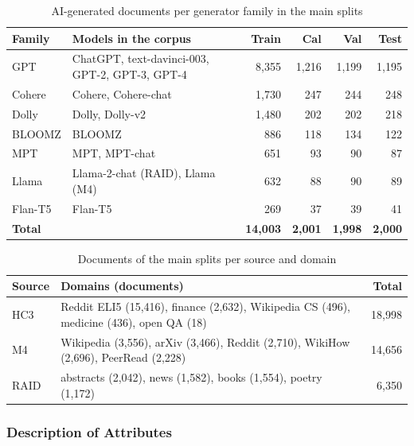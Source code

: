 \begin{table}[H]
\caption{AI-generated documents per generator family in the main splits}
\label{tab:families-corpus}
\centering
\small
\begin{tabularx}{\textwidth}{|p{2.4cm}|L|r|r|r|r|}
\hline
\textbf{Family} & \textbf{Models in the corpus} & \textbf{Train} & \textbf{Cal} & \textbf{Val} & \textbf{Test} \\ \hline
GPT & ChatGPT, text-davinci-003, GPT-2, GPT-3, GPT-4 & 8,355 & 1,216 & 1,199 & 1,195 \\ \hline
Cohere & Cohere, Cohere-chat & 1,730 & 247 & 244 & 248 \\ \hline
Dolly & Dolly, Dolly-v2 & 1,480 & 202 & 202 & 218 \\ \hline
BLOOMZ & BLOOMZ & 886 & 118 & 134 & 122 \\ \hline
MPT & MPT, MPT-chat & 651 & 93 & 90 & 87 \\ \hline
Llama & Llama-2-chat (RAID), Llama (M4) & 632 & 88 & 90 & 89 \\ \hline
Flan-T5 & Flan-T5 & 269 & 37 & 39 & 41 \\ \hline
\textbf{Total} & & \textbf{14,003} & \textbf{2,001} & \textbf{1,998} & \textbf{2,000} \\ \hline
\end{tabularx}
\end{table}

\begin{table}[H]
\caption{Documents of the main splits per source and domain}
\label{tab:domains-corpus}
\centering
\small
\begin{tabularx}{\textwidth}{|p{1.7cm}|L|r|}
\hline
\textbf{Source} & \textbf{Domains (documents)} & \textbf{Total} \\ \hline
HC3 & Reddit ELI5 (15,416), finance (2,632), Wikipedia CS (496), medicine (436), open QA (18) & 18,998 \\ \hline
M4 & Wikipedia (3,556), arXiv (3,466), Reddit (2,710), WikiHow (2,696), PeerRead (2,228) & 14,656 \\ \hline
RAID & abstracts (2,042), news (1,582), books (1,554), poetry (1,172) & 6,350 \\ \hline
\end{tabularx}
\end{table}

\subsubsection{Description of Attributes}

